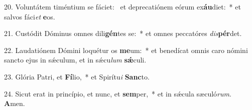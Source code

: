 20. Voluntátem timéntium se fáciet: \dag\  et deprecatiónem eórum ex\textbf{áu}diet:~*  et salvos fáci\textit{et} \textbf{e}os.\

21. Custódit Dóminus omnes dili\textbf{gén}tes se:~*  et omnes peccatóres \textit{dis}\textbf{pér}det.\

22. Laudatiónem Dómini loquétur os \textbf{me}um:~*  et benedícat omnis caro nómini sancto ejus in sǽculum, et in sǽcu\textit{lum} \textbf{sǽ}culi.\

23. Glória Patri, et \textbf{Fí}lio,~*  et Spirítu\textit{i} \textbf{Sanc}to.\

24. Sicut erat in princípio, et nunc, et \textbf{sem}per,~*  et in sǽcula sæculó\textit{rum}. \textbf{A}men.\

